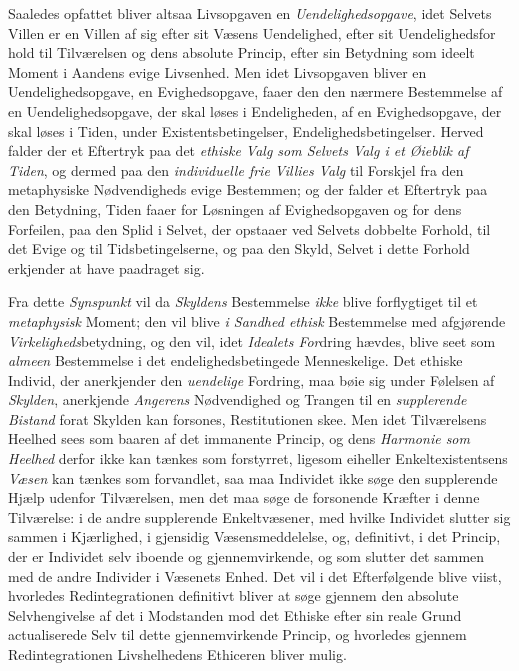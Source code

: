 Saaledes opfattet bliver altsaa Livsopgaven en \emph{Uendelighedsopgave}, idet
Selvets Villen er en Villen af sig efter sit Væsens Uendelighed, efter sit
Uendelighedsfor\-%
hold til Tilværelsen og dens absolute Princip, efter sin Betydning som ideelt
Moment i Aandens evige Livsenhed. Men idet Livsopgaven bliver en
Uendelighedsopgave, en Evighedsopgave, faaer den den nærmere Bestemmelse af en
Uendelighedsopgave, der skal løses i Endeligheden, af en Evighedsopgave, der
skal løses i Tiden, under Existentsbetingelser, Endelighedsbetingelser. Herved
falder der et Eftertryk paa det \emph{ethiske Valg som Selvets Valg i et
Øieblik af Tiden}, og dermed paa den \emph{individuelle frie Villies Valg} til
Forskjel fra den metaphysiske Nødvendigheds evige Bestemmen; og der falder et
Eftertryk paa den Betydning, Tiden faaer for Løsningen af Evighedsopgaven og
for dens Forfeilen, paa den Splid i Selvet, der opstaaer ved Selvets dobbelte
Forhold, til det Evige og til Tidsbetingelserne, og paa den Skyld, Selvet i
dette Forhold erkjender at have paadraget sig.

Fra dette \emph{Synspunkt} vil da \emph{Skyldens} Bestemmelse \emph{ikke} blive
forflygtiget til et \emph{metaphysisk} Moment; den vil blive \emph{i Sandhed
ethisk} Bestemmelse med afgjørende \emph{Virkeligheds}betydning, og den vil,
idet \emph{Idealets For}dring hævdes, blive seet som \emph{almeen} Bestemmelse i
det endelighedsbetingede Menneskelige. Det ethiske Individ, der anerkjender den
\emph{uendelige} Fordring, maa bøie sig under Følelsen af \emph{Skylden},
anerkjende \emph{Angerens} Nødvendighed og Trangen til en \emph{supplerende
Bistand} forat Skylden kan forsones, Restitutionen skee. Men idet Tilværelsens
Heelhed sees som baaren af det immanente Princip, og dens \emph{Harmonie som
Heelhed} derfor ikke kan tænkes som forstyrret, ligesom eiheller
Enkeltexistentsens \emph{Væsen} kan tænkes som forvandlet, saa maa Individet
ikke søge den supplerende Hjælp udenfor Tilværelsen, men det maa søge de
forsonende Kræfter i denne Tilværelse: i de andre supplerende Enkeltvæsener,
med hvilke Individet slutter sig sammen i Kjærlighed, i gjensidig
Væsensmeddelelse, og, definitivt, i det Princip, der er Individet selv iboende
og gjennemvirkende, og som slutter det sammen med de andre Individer i Væsenets
Enhed. Det vil i det Efterfølgende blive viist, hvorledes
 Redintegrationen definitivt bliver at søge gjennem den absolute Selvhengivelse
af det i Modstanden mod det Ethiske efter sin reale Grund actualiserede Selv
til dette gjennemvirkende Princip, og hvorledes gjennem Redintegrationen
Livshelhedens Ethiceren bliver mulig.

